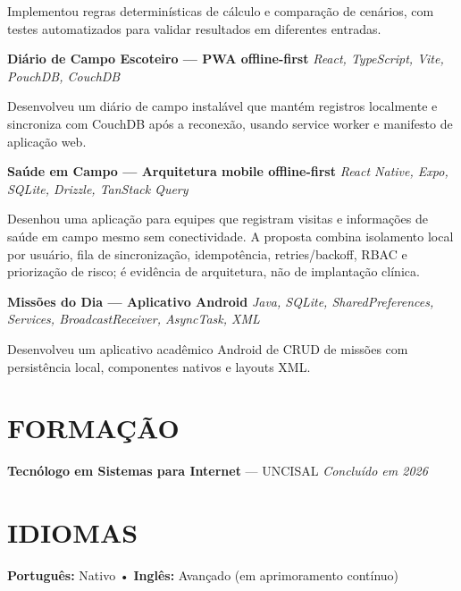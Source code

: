 \documentclass[10pt,a4paper]{article}
\begin{document}
\footnotesize

Implementou regras determinísticas de cálculo e comparação de cenários, com testes automatizados para validar resultados em diferentes entradas.

\vspace{0.5pt}

\noindent
\textbf{Diário de Campo Escoteiro — PWA offline-first}
\hfill
\textit{React, TypeScript, Vite, PouchDB, CouchDB}

\footnotesize

Desenvolveu um diário de campo instalável que mantém registros localmente e sincroniza com CouchDB após a reconexão, usando service worker e manifesto de aplicação web.

\vspace{0.5pt}

\noindent
\textbf{Saúde em Campo — Arquitetura mobile offline-first}
\hfill
\textit{React Native, Expo, SQLite, Drizzle, TanStack Query}

\footnotesize

Desenhou uma aplicação para equipes que registram visitas e informações de saúde em campo mesmo sem conectividade. A proposta combina isolamento local por usuário, fila de sincronização, idempotência, retries/backoff, RBAC e priorização de risco; é evidência de arquitetura, não de implantação clínica.

\vspace{0.5pt}

\noindent
\textbf{Missões do Dia — Aplicativo Android}
\hfill
\textit{Java, SQLite, SharedPreferences, Services, BroadcastReceiver, AsyncTask, XML}

\footnotesize

Desenvolveu um aplicativo acadêmico Android de CRUD de missões com persistência local, componentes nativos e layouts XML.


\section*{FORMAÇÃO}

\noindent
\textbf{Tecnólogo em Sistemas para Internet} — UNCISAL
\hfill
\textit{Concluído em 2026}


\vspace{-2pt}
\section*{IDIOMAS}

\noindent
\textbf{Português:} Nativo
\quad • \quad
\textbf{Inglês:} Avançado (em aprimoramento contínuo)
\end{document}
